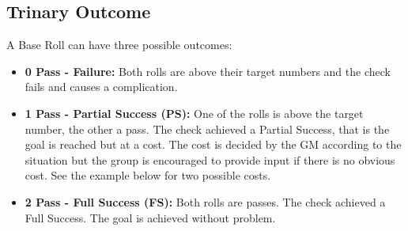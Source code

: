 \subsection{Trinary Outcome}
A Base Roll can have three possible outcomes: \\
\begin{itemize}
	\item \textbf{0 Pass - Failure:} Both rolls are above their target numbers and the check fails and causes a complication.
	\item \textbf{1 Pass - Partial Success (PS):} One of the rolls is above the target number, the other a pass. The check achieved a Partial Success, that is the goal is reached but at a cost. The cost is decided by the GM according to the situation but the group is encouraged to provide input if there is no obvious cost. See the example below for two possible costs.
	\item \textbf{2 Pass - Full Success (FS):} Both rolls are passes. The check achieved a Full Success. The goal is achieved without problem.
\end{itemize}

